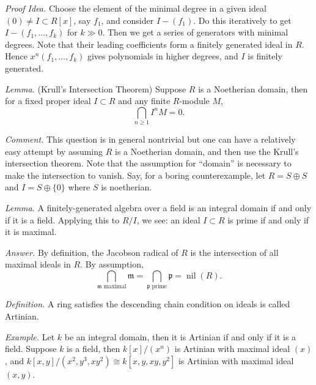 \documentclass{mathproblems}
\begin{document}
\begin{questions}
\textit{Proof Idea.} Choose the element of the minimal degree in a given ideal $(0)\neq I\subset R[x]$, say $f_1$, and consider $I-(f_1)$. Do this iteratively to get $I-(f_1,\ldots,f_k)$ for $k\gg 0$. Then we get a series of generators with minimal degrees. Note that their leading coefficients form a finitely generated ideal in $R$. Hence $x^n(f_1,\ldots,f_k)$ gives polynomials in higher degrees, and $I$ is finitely generated.


{\color{violet}
\textit{Lemma.} (Krull's Intersection Theorem) Suppose $R$ is a Noetherian domain, then for a fixed proper ideal $I\subset R$ and any finite $R$-module $M$, \vspace{-6pt}
$$
\bigcap_{n\geq 1} I^n M=0.
$$} \vspace{-16pt}

\textit{Comment.} This question is in general nontrivial but one can have a relatively easy attempt by assuming $R$ is a Noetherian domain, and then use the Krull's intersection theorem. Note that the assumption for ``domain'' is necessary to make the intersection to vanish. Say, for a boring counterexample, let $R=S\oplus S$ and $I=S\oplus \{0\}$ where $S$ is noetherian. 



{\color{violet}
\textit{Lemma.} A finitely-generated algebra over a field is an integral domain if and only if it is a field. Applying this to $R/I$, we see: an ideal $I\subset R$ is prime if and only if it is maximal.
}

\textit{Answer.} By definition, the Jacobson radical of $R$ is the intersection of all maximal ideals in $R$. By assumption,
$$
\bigcap_{\mathfrak{m}\text{ maximal}}\mathfrak{m}=\bigcap_{\mathfrak{p}\text{ prime}}\mathfrak{p}=\operatorname{nil}(R).
$$



\textit{Definition.} A ring satisfies the descending chain condition on ideals is called Artinian.

\textit{Example.} Let $k$ be an integral domain, then it is Artinian if and only if it is a field. Suppose $k$ is a field, then $k[x]/(x^n)$ is Artinian with maximal ideal $(x)$, and $k[x,y]/(x^2,y^3,xy^2)\cong k[x,y,xy,y^2]$ is Artinian with maximal ideal $(x,y)$.


\end{questions}
\end{document}
